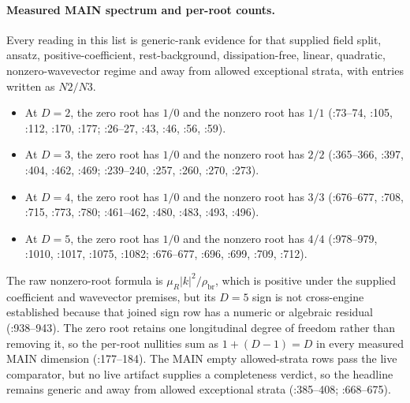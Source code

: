 \paragraph{Measured MAIN spectrum and per-root counts.}
Every reading in this list is generic-rank evidence for that supplied field
split, ansatz, positive-coefficient, rest-background, dissipation-free, linear,
quadratic, nonzero-wavevector regime and away from allowed exceptional strata,
with entries written as \(N2/N3\).
\begin{itemize}
\item At \(D=2\), the zero root has \(1/0\) and the nonzero root has \(1/1\)
(:73--74,
:105, :112, :170, :177;
:26--27,
:43, :46, :56, :59).
\item At \(D=3\), the zero root has \(1/0\) and the nonzero root has \(2/2\)
(:365--366,
:397, :404, :462, :469;
:239--240,
:257, :260, :270, :273).
\item At \(D=4\), the zero root has \(1/0\) and the nonzero root has \(3/3\)
(:676--677,
:708, :715, :773, :780;
:461--462,
:480, :483, :493, :496).
\item At \(D=5\), the zero root has \(1/0\) and the nonzero root has \(4/4\)
(:978--979,
:1010, :1017, :1075, :1082;
:676--677,
:696, :699, :709, :712).
\end{itemize}
The raw nonzero-root formula is \(\mu_R|k|^2/\rho_{\mathrm{br}}\), which is
positive under the supplied coefficient and wavevector premises, but its
\(D=5\) sign is not cross-engine established because that joined sign row has a
numeric or algebraic residual
(:938--943).
The zero root retains one longitudinal degree of freedom rather than removing
it, so the per-root nullities sum as \(1+(D-1)=D\) in every measured MAIN
dimension
(:177--184).
The MAIN empty allowed-strata rows pass the live comparator, but no live
artifact supplies a completeness verdict, so the headline remains generic and
away from allowed exceptional strata
(:385--408;
:668--675).

